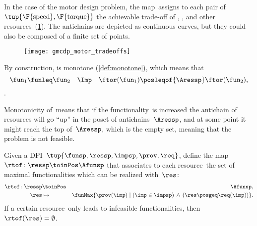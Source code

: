 \begin{example}
    In the case of the motor design problem, the map~\ftor assigns
    to each pair of~$\tup{\F{\text{speed}},\F{\text{torque}}}$
    the achievable trade-off of , , and other resources~(\cref{fig:motor-trade-offs}).
    The antichains are depicted as continuous curves, but they could also
    be composed of a finite set of points.

\end{example}
\begin{figure}
    \texttt{[image: gmcdp\_motor\_tradeoffs]}
    \caption{}
    \label{fig:motor-trade-offs}
\end{figure}

By construction, \ftor is monotone (\cref{def:monotone}), which means that
\begin{equation*}
    \fun_{1}\funleq\fun_{2}\quad\Imp\quad\ftor(\fun_{1})\posleqof{\Aressp}\ftor(\fun_{2}),
\end{equation*}.


Monotonicity of~\ftor means that if the functionality~\fun is increased the antichain of resources will go ``up'' in the poset of antichains~$\Aressp$,
and at some point it might reach the top of~$\Aressp$, which is the empty set, meaning that the problem is not feasible.

\begin{definition}
    \label{def:rtof}
    Given a DPI~$\tup{ \funsp,\ressp,\impsp,\prov,\req}$,
    define the map~$\rtof\colon \ressp\toinPos \Afunsp$ that associates
    to each resource~\res the set of maximal functionalities which can be realized with~$\res$:
    \begin{eqnarray*}
        \rtof\colon \ressp & \toinPos & \Afunsp,\\
        \res& \mapsto & \funMax\{\prov(\imp)\mid\left(\imp\in\impsp\right)\,\wedge\,\left(\res\posgeq\req(\imp)\right)\}.
    \end{eqnarray*}
    If a certain resource~\res only leads to infeasible functionalities, then~$\rtof(\res)=\emptyset$.
\end{definition}


